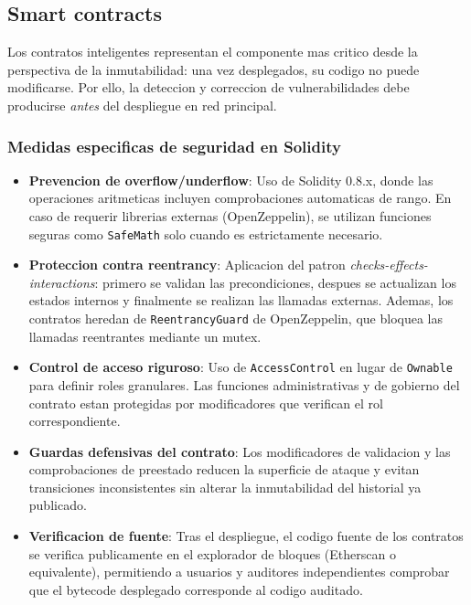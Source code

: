 \documentclass[11pt, a4paper]{article}
\begin{document}
\subsection{Smart contracts}

Los contratos inteligentes representan el componente mas critico desde la perspectiva de la inmutabilidad: una vez desplegados, su codigo no puede modificarse. Por ello, la deteccion y correccion de vulnerabilidades debe producirse \textit{antes} del despliegue en red principal.

\subsubsection{Medidas especificas de seguridad en Solidity}

\begin{itemize}
    \item \textbf{Prevencion de overflow/underflow}: Uso de Solidity 0.8.x, donde las operaciones aritmeticas incluyen comprobaciones automaticas de rango. En caso de requerir librerias externas (OpenZeppelin), se utilizan funciones seguras como \texttt{SafeMath} solo cuando es estrictamente necesario.
    \item \textbf{Proteccion contra reentrancy}: Aplicacion del patron \textit{checks-effects-interactions}: primero se validan las precondiciones, despues se actualizan los estados internos y finalmente se realizan las llamadas externas. Ademas, los contratos heredan de \texttt{ReentrancyGuard} de OpenZeppelin, que bloquea las llamadas reentrantes mediante un mutex.
    \item \textbf{Control de acceso riguroso}: Uso de \texttt{AccessControl} en lugar de \texttt{Ownable} para definir roles granulares. Las funciones administrativas y de gobierno del contrato estan protegidas por modificadores que verifican el rol correspondiente.
    \item \textbf{Guardas defensivas del contrato}: Los modificadores de validacion y las comprobaciones de preestado reducen la superficie de ataque y evitan transiciones inconsistentes sin alterar la inmutabilidad del historial ya publicado.
    \item \textbf{Verificacion de fuente}: Tras el despliegue, el codigo fuente de los contratos se verifica publicamente en el explorador de bloques (Etherscan o equivalente), permitiendo a usuarios y auditores independientes comprobar que el bytecode desplegado corresponde al codigo auditado.
\end{itemize}
\end{document}
